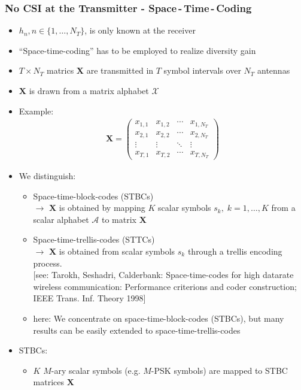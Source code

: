 \documentclass[a4paper, 10pt]{article}
\begin{document}
\subsubsection{No CSI at the Transmitter - Space\,-\,Time\,-\,Coding}
\begin{itemize}
	\item $h_n, n\in\{1,\dots ,N_T\}$, is only known at the receiver
	\item ``Space-time-coding'' has to be employed to realize diversity gain
	\item $T\times N_T$ matrics $\mathbf{X}$ are transmitted in $T$ symbol intervals over $N_T$ antennas
	\item $\mathbf{X}$ is drawn from a matrix alphabet $\mathcal{X}$
	\item Example:
	\begin{align*}
		\mathbf{X}=\begin{pmatrix} x_{1,1} & x_{1,2} & \cdots & x_{1,N_T} \\
					   x_{2,1} & x_{2,2} & \cdots & x_{2,N_T} \\
					   \vdots  & \vdots  & \ddots & \vdots    \\
				 	   x_{T,1} & x_{T,2} & \cdots & x_{T,N_T}
			\end{pmatrix}
	\end{align*}
	\item We distinguish:
		\begin{itemize}
			\item Space-time-block-codes (STBCs)\\
			$\rightarrow$ $\mathbf{X}$ is obtained by mapping $K$ scalar symbols $s_k,\; k=1, \dots , K$ from a scalar alphabet $\mathcal{A}$ to matrix $\mathbf{X}$
			\item Space-time-trellis-codes (STTCs)\\
			$\rightarrow$ $\mathbf{X}$ is obtained from scalar symbols $s_k$ through a trellis encoding process.\\
			{\small[see: Tarokh, Seshadri, Calderbank: Space-time-codes for high datarate wireless communication: Performance criterions and coder construction; IEEE Trans. Inf. Theory 1998]}
			\item here: We concentrate on space-time-block-codes (STBCs), but many results can be easily extended to space-time-trellis-codes
		\end{itemize}
	\item STBCs:
		\begin{itemize}
			\item  $K$ $M$-ary scalar symbols (e.g. $M$-PSK symbols) are mapped to STBC matrices $\mathbf{X}$\\ 

\end{itemize}
\end{itemize}
\end{document}
